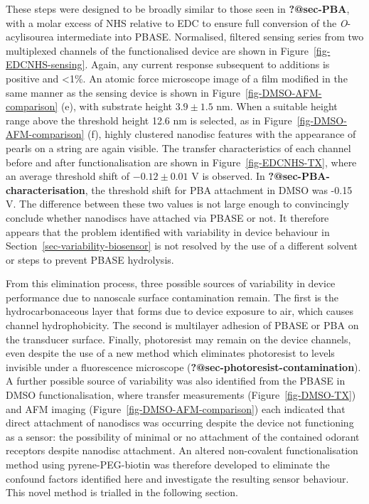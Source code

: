 \documentclass[
  a4paper,
]{scrbook}
\begin{document}
These steps were designed to be broadly similar to those seen in
\textbf{?@sec-PBA}, with a molar excess of NHS relative to EDC to ensure
full conversion of the \emph{O}-acylisourea intermediate into PBASE.
Normalised, filtered sensing series from two multiplexed channels of the
functionalised device are shown in Figure~\ref{fig-EDCNHS-sensing}.
Again, any current response subsequent to additions is positive and
\textless1\%. An atomic force microscope image of a film modified in the
same manner as the sensing device is shown in
Figure~\ref{fig-DMSO-AFM-comparison} (e), with substrate height
\(3.9\pm1.5\) nm. When a suitable height range above the threshold
height 12.6 nm is selected, as in Figure~\ref{fig-DMSO-AFM-comparison}
(f), highly clustered nanodisc features with the appearance of pearls on
a string are again visible. The transfer characteristics of each channel
before and after functionalisation are shown in
Figure~\ref{fig-EDCNHS-TX}, where an average threshold shift of
\(-0.12\pm0.01\) V is observed. In \textbf{?@sec-PBA-characterisation},
the threshold shift for PBA attachment in DMSO was -0.15 V. The
difference between these two values is not large enough to convincingly
conclude whether nanodiscs have attached via PBASE or not. It therefore
appears that the problem identified with variability in device behaviour
in Section~\ref{sec-variability-biosensor} is not resolved by the use of
a different solvent or steps to prevent PBASE hydrolysis.

From this elimination process, three possible sources of variability in
device performance due to nanoscale surface contamination remain. The
first is the hydrocarbonaceous layer that forms due to device exposure
to air, which causes channel hydrophobicity. The second is multilayer
adhesion of PBASE or PBA on the transducer surface. Finally, photoresist
may remain on the device channels, even despite the use of a new method
which eliminates photoresist to levels invisible under a fluorescence
microscope (\textbf{?@sec-photoresist-contamination}). A further
possible source of variability was also identified from the PBASE in
DMSO functionalisation, where transfer measurements
(Figure~\ref{fig-DMSO-TX}) and AFM imaging
(Figure~\ref{fig-DMSO-AFM-comparison}) each indicated that direct
attachment of nanodiscs was occurring despite the device not functioning
as a sensor: the possibility of minimal or no attachment of the
contained odorant receptors despite nanodisc attachment. An altered
non-covalent functionalisation method using pyrene-PEG-biotin was
therefore developed to eliminate the confound factors identified here
and investigate the resulting sensor behaviour. This novel method is
trialled in the following section.
\end{document}
